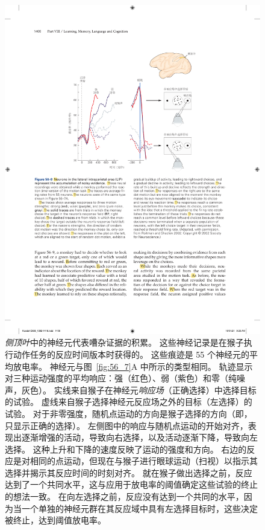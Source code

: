 \begin{figure}[htbp]
	\centering
	\includegraphics[width=0.75\linewidth]{chap56/fig_56_8}
	\caption{\textit{侧顶叶}中的神经元代表嘈杂证据的积累。
		这些神经记录是在猴子执行动作任务的反应时间版本时获得的。
		这些痕迹是 55 个神经元的平均放电率。
		神经元与图~\ref{fig:56_7}A 中所示的类型相同。
		轨迹显示对三种运动强度的平均响应：强（红色）、弱（紫色）和零（纯噪声，灰色）。
		实线来自猴子在神经元\textit{响应场}（正确选择）中选择目标的试验。
		虚线来自猴子选择神经元反应场之外的目标（左选择）的试验。
		对于非零强度，随机点运动的方向是猴子选择的方向（即，只显示正确的选择）。
		左侧图中的响应与随机点运动的开始对齐，表现出逐渐增强的活动，导致向右选择，以及活动逐渐下降，导致向左选择。
		这种上升和下降的速度反映了运动的强度和方向。
		右边的反应是对相同的点运动，但现在与猴子进行眼球运动（扫视）以指示其选择并揭示其反应时间的时刻对齐。
		就在猴子做出选择之前，反应达到了一个共同水平，这与应用于放电率的阈值确定这些试验的终止的想法一致。
		在向左选择之前，反应没有达到一个共同的水平，因为当一个单独的神经元群在其反应域中具有左选择目标时，这些决定被终止，达到阈值放电率\cite{roitman2002response}。}
	\label{fig:56_8}
\end{figure}


